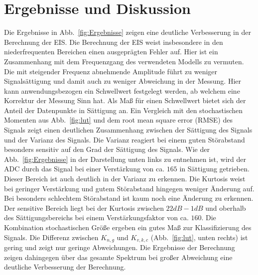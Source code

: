 \section{Ergebnisse und Diskussion}
Die Ergebnisse in Abb.~\ref{fig:Ergebnisse} zeigen eine deutliche Verbesserung in der Berechnung der EIS.
Die Berechnung der EIS weist insbesondere in den niederfrequenten Bereichen einen ausgeprägten Fehler auf. Hier ist ein Zusammenhang mit dem Frequenzgang des verwendeten Modells zu vermuten. Die mit steigender Frequenz abnehmende Amplitude führt zu weniger Signalsättigung und damit auch zu weniger Abweichung in der Messung. Hier kann anwendungsbezogen ein Schwellwert festgelegt werden, ab welchem eine Korrektur der Messung Sinn hat. Als Maß für einen Schwellwert bietet sich der Anteil der Datenpunkte in Sättigung an. Ein Vergleich mit den stochastischen Momenten aus Abb.~\ref{fig:lut} und dem root mean square error (RMSE) des Signals zeigt einen deutlichen Zusammenhang zwischen der Sättigung des Signals und der Varianz des Signals. Die Varianz reagiert bei einem guten Störabstand besonders sensitiv auf den Grad der Sättigung des Signals. Wie der Abb.~\ref{fig:Ergebnisse} in der Darstellung unten links zu entnehmen ist, wird der ADC durch das Signal bei einer Verstärkung von ca. $165$ in Sättigung getrieben. Dieser Bereich ist auch deutlich in der Varianz zu erkennen. Die Kurtosis weist bei geringer Verstärkung und gutem Störabstand hingegen weniger Änderung auf. Bei besonders schlechtem Störabstand ist kaum noch eine Änderung zu erkennen. Der sensitive Bereich liegt bei der Kurtosis zwischen $22dB - 1dB$ und oberhalb des Sättigungsbereichs bei einem Verstärkungsfaktor von ca. $160$. Die Kombination stochastischen Größe ergeben ein gutes Maß zur Klassifizierung des Signals. Die Differenz zwischen $K_{n,g}$ und $K_{v,k,c}$ (Abb.~\ref{fig:lut}, unten rechts) ist gering und zeigt nur geringe Abweichungen. Die Ergebnisse der Berechnung zeigen dahingegen über das gesamte Spektrum bei großer Abweichung eine deutliche Verbesserung der Berechnung.
